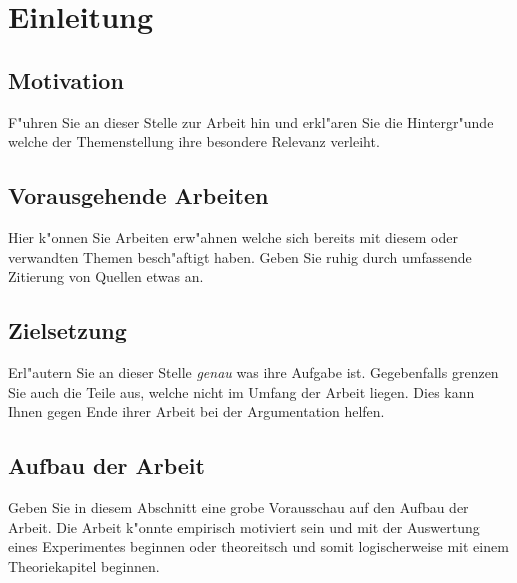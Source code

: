 \chapter{Einleitung}

\section{Motivation}

F"uhren Sie an dieser Stelle zur Arbeit hin und erkl"aren Sie die Hintergr"unde welche der Themenstellung ihre besondere Relevanz verleiht.

\section{Vorausgehende Arbeiten}

Hier k"onnen Sie Arbeiten erw"ahnen welche sich bereits mit diesem oder verwandten Themen besch"aftigt haben. Geben Sie ruhig durch umfassende Zitierung von Quellen etwas an.

\section{Zielsetzung}

Erl"autern Sie an dieser Stelle \emph{genau} was ihre Aufgabe ist. Gegebenfalls grenzen Sie auch die Teile aus, welche nicht im Umfang der Arbeit liegen. Dies kann Ihnen gegen Ende ihrer Arbeit bei der Argumentation helfen.

\section{Aufbau der Arbeit}

Geben Sie in diesem Abschnitt eine grobe Vorausschau auf den Aufbau der Arbeit. Die Arbeit k"onnte empirisch motiviert sein und mit der Auswertung eines Experimentes beginnen oder theoreitsch und somit logischerweise mit einem Theoriekapitel beginnen.
